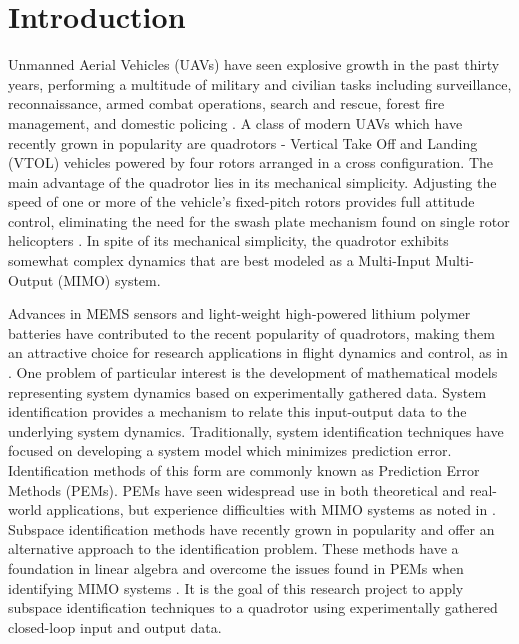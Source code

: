 \chapter{Introduction}

Unmanned Aerial Vehicles (UAVs) have seen explosive growth in the past thirty years, performing a multitude of military and civilian tasks including surveillance, reconnaissance, armed combat operations, search and rescue, forest fire management, and domestic policing \cite{sarris2001survey, valavanis2007advances}. A class of modern UAVs which have recently grown in popularity are quadrotors -  Vertical Take Off and Landing (VTOL) vehicles powered by four rotors arranged in a cross configuration. The main advantage of the quadrotor lies in its mechanical simplicity. Adjusting the speed of one or more of the vehicle's fixed-pitch rotors provides full attitude control, eliminating the need for the swash plate mechanism found on single rotor helicopters \cite{bramwell2001bramwell, gupte2012survey}. In spite of its mechanical simplicity, the quadrotor exhibits somewhat complex dynamics that are best modeled as a Multi-Input Multi-Output (MIMO) system.

Advances in MEMS sensors and light-weight high-powered lithium polymer batteries have contributed to the recent popularity of quadrotors, making them an attractive choice for research applications in flight dynamics and control, as in \cite{hoffmann2007quadrotor, kivrak2006design, mellinger2010control, michael2010grasp}. One problem of particular interest is the development of mathematical models representing system dynamics based on experimentally gathered data. System identification provides a mechanism to relate this input-output data to the underlying system dynamics. Traditionally, system identification techniques have focused on developing a system model which minimizes prediction error. Identification methods of this form are commonly known as Prediction Error Methods (PEMs). PEMs have seen widespread use in both theoretical and real-world applications, but experience difficulties with MIMO systems as noted in \cite{qin2006overview, viberg1995subspace}. Subspace identification methods have recently grown in popularity and offer an alternative approach to the identification problem. These methods have a foundation in linear algebra and overcome the issues found in PEMs when identifying MIMO systems \cite{katayama2005subspace}. It is the goal of this research project to apply subspace identification techniques to a quadrotor using experimentally gathered closed-loop input and output data.


